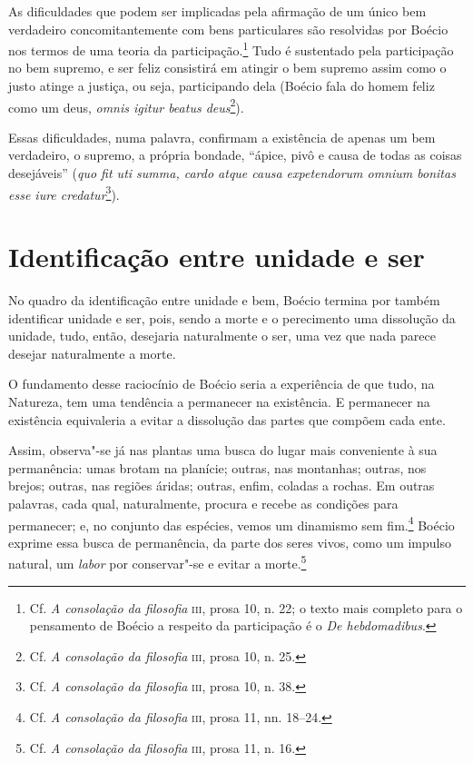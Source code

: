 As dificuldades que podem ser implicadas pela afirmação de um
único bem verdadeiro concomitantemente com bens particulares são
resolvidas por Boécio nos termos de uma teoria da
participação.\footnote{ Cf. \emph{A consolação da filosofia}
\textsc{iii}, prosa 10, n. 22; o texto mais completo para o pensamento de
Boécio a respeito da participação é o \emph{De
hebdomadibus}.} Tudo é sustentado pela participação no bem
supremo, e ser feliz consistirá em atingir o bem supremo assim
como o justo atinge a justiça, ou seja, participando dela
(Boécio fala do homem feliz como um deus, \emph{omnis igitur
beatus deus}\footnote{ Cf. \emph{A consolação da filosofia}
\textsc{iii}, prosa 10, n. 25.}).

Essas dificuldades, numa palavra, confirmam a existência de
apenas um bem verdadeiro, o supremo, a própria bondade, “ápice,
pivô e causa de todas as coisas desejáveis” (\emph{quo fit uti
summa, cardo atque causa expetendorum omnium bonitas esse iure
credatur}\footnote{ Cf. \emph{A consolação da filosofia}
\textsc{iii},
prosa 10, n. 38.}).

\section{Identificação entre unidade e ser}

No quadro da identificação entre unidade e bem, Boécio termina
por também identificar unidade e ser, pois, sendo a morte e o
perecimento uma dissolução da unidade, tudo, então, desejaria
naturalmente o ser, uma vez que nada parece desejar naturalmente
a morte.

O fundamento desse raciocínio de Boécio seria a experiência de
que tudo, na Natureza, tem uma tendência a permanecer na
existência. E permanecer na existência equivaleria a evitar a
dissolução das partes que compõem cada ente.

Assim, observa"-se já nas plantas uma busca do lugar mais
conveniente à sua permanência: umas brotam na planície; outras,
nas montanhas; outras, nos brejos; outras, nas regiões áridas;
outras, enfim, coladas a rochas. Em outras palavras, cada qual,
naturalmente, procura e recebe as condições para permanecer; e,
no conjunto das espécies, vemos um dinamismo sem fim.\footnote{
Cf. \emph{A consolação da filosofia} \textsc{iii}, prosa 11, nn.
18--24.} Boécio exprime essa busca de permanência, da parte dos
seres vivos, como um impulso natural, um \emph{labor} por
conservar"-se e evitar a morte.\footnote{ Cf. \emph{A consolação
da filosofia} \textsc{iii}, prosa 11, n. 16.}

